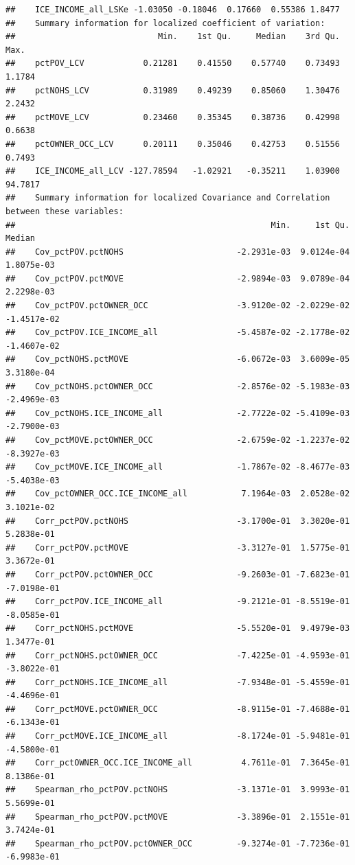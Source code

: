 \documentclass[
]{book}
\begin{document}
\begin{lstlisting}
##    ICE_INCOME_all_LSKe -1.03050 -0.18046  0.17660  0.55386 1.8477
##    Summary information for localized coefficient of variation:
##                             Min.    1st Qu.     Median    3rd Qu.    Max.
##    pctPOV_LCV            0.21281    0.41550    0.57740    0.73493  1.1784
##    pctNOHS_LCV           0.31989    0.49239    0.85060    1.30476  2.2432
##    pctMOVE_LCV           0.23460    0.35345    0.38736    0.42998  0.6638
##    pctOWNER_OCC_LCV      0.20111    0.35046    0.42753    0.51556  0.7493
##    ICE_INCOME_all_LCV -127.78594   -1.02921   -0.35211    1.03900 94.7817
##    Summary information for localized Covariance and Correlation between these variables:
##                                                    Min.     1st Qu.      Median
##    Cov_pctPOV.pctNOHS                       -2.2931e-03  9.0124e-04  1.8075e-03
##    Cov_pctPOV.pctMOVE                       -2.9894e-03  9.0789e-04  2.2298e-03
##    Cov_pctPOV.pctOWNER_OCC                  -3.9120e-02 -2.0229e-02 -1.4517e-02
##    Cov_pctPOV.ICE_INCOME_all                -5.4587e-02 -2.1778e-02 -1.4607e-02
##    Cov_pctNOHS.pctMOVE                      -6.0672e-03  3.6009e-05  3.3180e-04
##    Cov_pctNOHS.pctOWNER_OCC                 -2.8576e-02 -5.1983e-03 -2.4969e-03
##    Cov_pctNOHS.ICE_INCOME_all               -2.7722e-02 -5.4109e-03 -2.7900e-03
##    Cov_pctMOVE.pctOWNER_OCC                 -2.6759e-02 -1.2237e-02 -8.3927e-03
##    Cov_pctMOVE.ICE_INCOME_all               -1.7867e-02 -8.4677e-03 -5.4038e-03
##    Cov_pctOWNER_OCC.ICE_INCOME_all           7.1964e-03  2.0528e-02  3.1021e-02
##    Corr_pctPOV.pctNOHS                      -3.1700e-01  3.3020e-01  5.2838e-01
##    Corr_pctPOV.pctMOVE                      -3.3127e-01  1.5775e-01  3.3672e-01
##    Corr_pctPOV.pctOWNER_OCC                 -9.2603e-01 -7.6823e-01 -7.0198e-01
##    Corr_pctPOV.ICE_INCOME_all               -9.2121e-01 -8.5519e-01 -8.0585e-01
##    Corr_pctNOHS.pctMOVE                     -5.5520e-01  9.4979e-03  1.3477e-01
##    Corr_pctNOHS.pctOWNER_OCC                -7.4225e-01 -4.9593e-01 -3.8022e-01
##    Corr_pctNOHS.ICE_INCOME_all              -7.9348e-01 -5.4559e-01 -4.4696e-01
##    Corr_pctMOVE.pctOWNER_OCC                -8.9115e-01 -7.4688e-01 -6.1343e-01
##    Corr_pctMOVE.ICE_INCOME_all              -8.1724e-01 -5.9481e-01 -4.5800e-01
##    Corr_pctOWNER_OCC.ICE_INCOME_all          4.7611e-01  7.3645e-01  8.1386e-01
##    Spearman_rho_pctPOV.pctNOHS              -3.1371e-01  3.9993e-01  5.5699e-01
##    Spearman_rho_pctPOV.pctMOVE              -3.3896e-01  2.1551e-01  3.7424e-01
##    Spearman_rho_pctPOV.pctOWNER_OCC         -9.3274e-01 -7.7236e-01 -6.9983e-01

\end{lstlisting}
\end{document}
